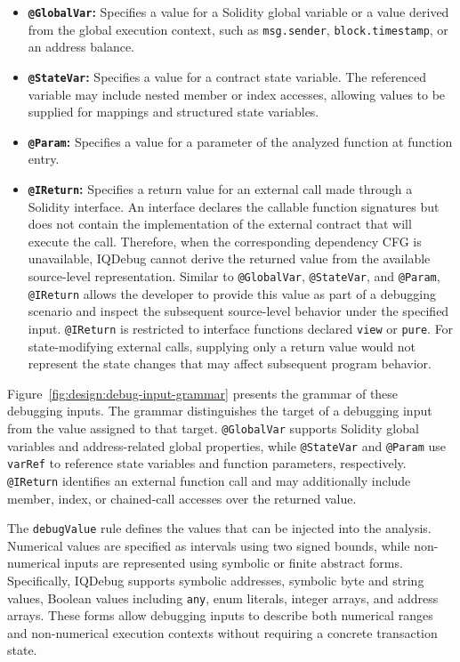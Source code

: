 \documentclass[11pt,oneside]{report}
\theoremstyle{plain}
\theoremstyle{definition}
\theoremstyle{remark}
\begin{document}
\begin{itemize}
    \item \textbf{\texttt{@GlobalVar}:} Specifies a value for a Solidity global variable or a value derived from the global execution context, such as \texttt{msg.sender}, \texttt{block.timestamp}, or an address balance.

    \item \textbf{\texttt{@StateVar}:} Specifies a value for a contract state variable. The referenced variable may include nested member or index accesses, allowing values to be supplied for mappings and structured state variables.

    \item \textbf{\texttt{@Param}:} Specifies a value for a parameter of the analyzed function at function entry.

    \item \textbf{\texttt{@IReturn}:} Specifies a return value for an external call made through a Solidity interface. An interface declares the callable function signatures but does not contain the implementation of the external contract that will execute the call. Therefore, when the corresponding dependency CFG is unavailable, IQDebug cannot derive the returned value from the available source-level representation. Similar to \texttt{@GlobalVar}, \texttt{@StateVar}, and \texttt{@Param}, \texttt{@IReturn} allows the developer to provide this value as part of a debugging scenario and inspect the subsequent source-level behavior under the specified input. \texttt{@IReturn} is restricted to interface functions declared \texttt{view} or \texttt{pure}. For state-modifying external calls, supplying only a return value would not represent the state changes that may affect subsequent program behavior.  
\end{itemize}

Figure~\ref{fig:design:debug-input-grammar} presents the grammar of these debugging inputs.
The grammar distinguishes the target of a debugging input from the value assigned to that target.
\texttt{@GlobalVar} supports Solidity global variables and address-related global properties, while \texttt{@StateVar} and \texttt{@Param} use \texttt{varRef} to reference state variables and function parameters, respectively.
\texttt{@IReturn} identifies an external function call and may additionally include member, index, or chained-call accesses over the returned value.

The \texttt{debugValue} rule defines the values that can be injected into the analysis.
Numerical values are specified as intervals using two signed bounds, while non-numerical inputs are represented using symbolic or finite abstract forms.
Specifically, IQDebug supports symbolic addresses, symbolic byte and string values, Boolean values including \texttt{any}, enum literals, integer arrays, and address arrays.
These forms allow debugging inputs to describe both numerical ranges and non-numerical execution contexts without requiring a concrete transaction state.
\end{document}
